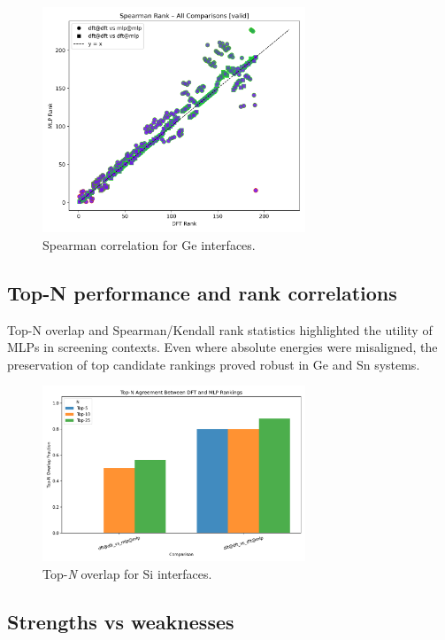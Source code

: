 \begin{figure}[h]
    \centering
    \includegraphics[width=0.7\textwidth]{analysis/plots/results_lower_Ge_spearman_all_comparisons_valid.png}
    \caption{Spearman correlation for Ge interfaces.}
\end{figure}

\subsection{Top-N performance and rank correlations}

Top-N overlap and Spearman/Kendall rank statistics highlighted the utility of MLPs in screening contexts. Even where
absolute energies were misaligned, the preservation of top candidate rankings proved robust in Ge and Sn systems.

\begin{figure}[h]
    \centering
    \includegraphics[width=0.7\textwidth]{analysis/plots/results_lower_Si_topn_overlap.png}
    \caption{Top-\textit{N} overlap for Si interfaces.}
\end{figure}

\subsection{Strengths vs weaknesses}

